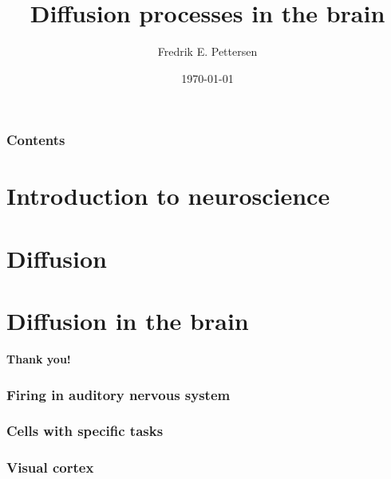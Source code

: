 \documentclass{beamer}
\title[Presentation - Kongsberg Defence \& Aerospace]{Diffusion processes in the brain}
\author{Fredrik E. Pettersen}
\date{\today}
\begin{document}
\begin{frame}
\titlepage
\end{frame}



\begin{frame}
 \frametitle{Contents}
 \tableofcontents[hideallsubsections]
\end{frame}

\section{Introduction to neuroscience}



\section{Diffusion}



\section{Diffusion in the brain}



\begin{frame}
\begin{center}
 \textbf{Thank you!}
\end{center}
\end{frame}





\begin{frame}
 \frametitle{Firing in auditory nervous system}
\end{frame}


\begin{frame}
\frametitle{Cells with specific tasks}

\end{frame}

\begin{frame}
\frametitle{Visual cortex}
\movie[]{}{}
\end{frame}
\end{document}
